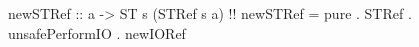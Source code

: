 \begin{code}
newSTRef :: a -> ST s (STRef s a)  !!
newSTRef =
  pure . STRef . unsafePerformIO . newIORef
\end{code}
